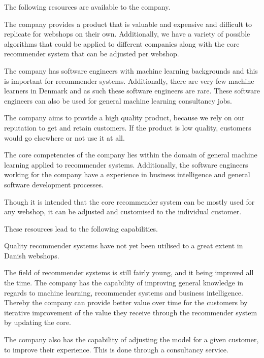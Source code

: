 The following resources are available to the company.
\begin{description}[style=nextline]
\item[Software Product]
The company provides a product that is valuable and expensive and difficult to replicate for webshops on their own. 
Additionally, we have a variety of possible algorithms that could be applied to different companies along with the core recommender system that can be adjusted per webshop.
\item[People \& Talent]
The company has software engineers with machine learning backgrounds and this is important for recommender systems. 
Additionally, there are very few machine learners in Denmark and as such these software engineers are rare. 
These software engineers can also be used for general machine learning consultancy jobs.
\item[Core Values]
The company aims to provide a high quality product, because we rely on our reputation to get and retain customers. 
If the product is low quality, customers would go elsewhere or not use it at all. 
\item[Knowledge]
The core competencies of the company lies within the domain of general machine learning applied to recommender systems. 
Additionally, the software engineers working for the company have a experience in business intelligence and general software development processes.
\item[Increased Capabilities]
Though it is intended that the core recommender system can be mostly used for any webshop, it can be adjusted and customised to the individual customer.
\end{description}

These resources lead to the following capabilities.
\begin{description}[style=nextline]
\item[Provide quality recommender systems]
Quality recommender systems have not yet been utilised to a great extent in Danish webshops.
\item[Improvement of knowledge base]
The field of recommender systems is still fairly young, and it being improved all the time. 
The company has the capability of improving general knowledge in regards to machine learning, recommender systems and business intelligence. 
Thereby the company can provide better value over time for the customers by iterative improvement of the value they receive through the recommender system by updating the core.
\item[Response to Customer Needs]
The company also has the capability of adjusting the model for a given customer, to improve their experience. This is done through a consultancy service.
\end{description}

